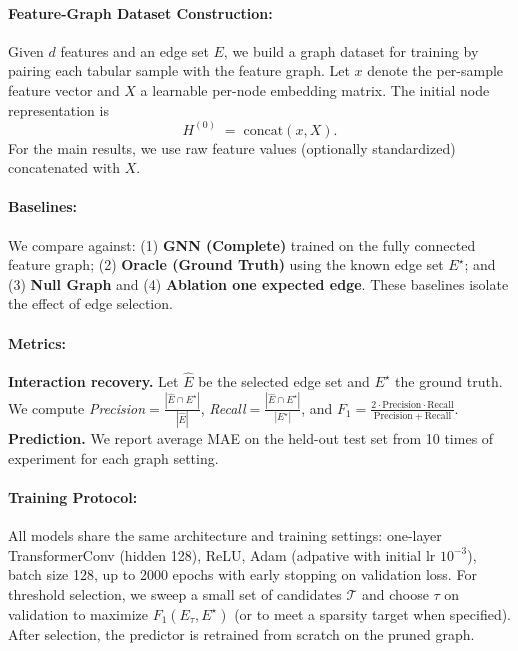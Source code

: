 \documentclass[10pt,a4paper]{article}
\begin{document}
\paragraph{Feature-Graph Dataset Construction:}
Given $d$ features and an edge set $E$, we build a graph dataset for training by pairing each tabular sample with the feature graph. Let $x$ denote the per-sample feature vector and $X$ a learnable per-node embedding matrix. The initial node representation is
\begin{equation}
H^{(0)} \;=\; \mathrm{concat}(x, X).
\end{equation}
For the main results, we use raw feature values (optionally standardized) concatenated with $X$.


\paragraph{Baselines:}
We compare against: (1) \textbf{GNN (Complete)} trained on the fully connected feature graph; (2) \textbf{Oracle (Ground Truth)} using the known edge set $E^\star$; and (3) \textbf{Null Graph} and (4) \textbf{Ablation one expected edge}. These baselines isolate the effect of edge selection.


\paragraph{Metrics:}
\textbf{Interaction recovery.} Let $\widehat{E}$ be the selected edge set and $E^\star$ the ground truth. We compute \emph{Precision}$=\tfrac{|\widehat{E} \cap E^\star|}{|\widehat{E}|}$, \emph{Recall}$=\tfrac{|\widehat{E} \cap E^\star|}{|E^\star|}$, and $F_1=\tfrac{2\cdot \mathrm{Precision}\cdot \mathrm{Recall}}{\mathrm{Precision}+\mathrm{Recall}}$. \textbf{Prediction.} We report average MAE on the held-out test set from 10 times of experiment for each graph setting.


\paragraph{Training Protocol:}
All models share the same architecture and training settings: one-layer TransformerConv (hidden 128), ReLU, Adam (adpative with initial lr $10^{-3}$), batch size 128, up to 2000 epochs with early stopping on validation loss. For threshold selection, we sweep a small set of candidates $\mathcal{T}$ and choose $\tau$ on validation to maximize $F_1(E_\tau, E^\star)$ (or to meet a sparsity target when specified). After selection, the predictor is retrained from scratch on the pruned graph.
\end{document}
